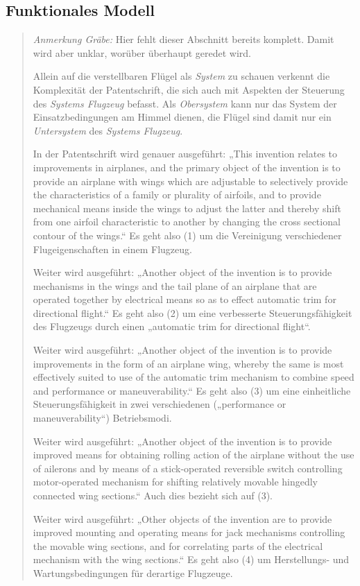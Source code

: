 \documentclass[11pt,a4paper]{article}
\newcommand{\HGG}[1]{\begin{quote} \emph{Anmerkung Gräbe:} #1  \end{quote}}
\begin{document}
\subsection{Funktionales Modell}

\HGG{Hier fehlt dieser Abschnitt bereits komplett. Damit wird aber unklar,
  worüber überhaupt geredet wird.

  Allein auf die verstellbaren Flügel als \emph{System} zu schauen verkennt
  die Komplexität der Patentschrift, die sich auch mit Aspekten der Steuerung
  des \emph{Systems Flugzeug} befasst.  Als \emph{Obersystem} kann nur das
  System der Einsatzbedingungen am Himmel dienen, die Flügel sind damit nur
  ein \emph{Untersystem} des \emph{Systems Flugzeug}.

  In der Patentschrift wird genauer ausgeführt: „This invention relates to
  improvements in airplanes, and the primary object of the invention is to
  provide an airplane with wings which are adjustable to selectively provide
  the characteristics of a family or plurality of airfoils, and to provide
  mechanical means inside the wings to adjust the latter and thereby shift
  from one airfoil characteristic to another by changing the cross sectional
  contour of the wings.“ Es geht also (1) um die Vereinigung verschiedener
  Flugeigenschaften in einem Flugzeug.

  Weiter wird ausgeführt: „Another object of the invention is to provide
  mechanisms in the wings and the tail plane of an airplane that are operated
  together by electrical means so as to effect automatic trim for directional
  flight.“ Es geht also (2) um eine verbesserte Steuerungsfähigkeit des
  Flugzeugs durch einen „automatic trim for directional flight“.

  Weiter wird ausgeführt: „Another object of the invention is to provide
  improvements in the form of an airplane wing, whereby the same is most
  effectively suited to use of the automatic trim mechanism to combine speed
  and performance or maneuverability.“ Es geht also (3) um eine einheitliche
  Steuerungsfähigkeit in zwei verschiedenen („performance or maneuverability“)
  Betriebsmodi.

  Weiter wird ausgeführt: „Another object of the invention is to provide
  improved means for obtaining rolling action of the airplane without the use
  of ailerons and by means of a stick-operated reversible switch controlling
  motor-operated mechanism for shifting relatively movable hingedly connected
  wing sections.“ Auch dies bezieht sich auf (3).

  Weiter wird ausgeführt: „Other objects of the invention are to provide
  improved mounting and operating means for jack mechanisms controlling the
  movable wing sections, and for correlating parts of the electrical mechanism
  with the wing sections.“ Es geht also (4) um Herstellungs- und
  Wartungsbedingungen für derartige Flugzeuge. }
\end{document}
